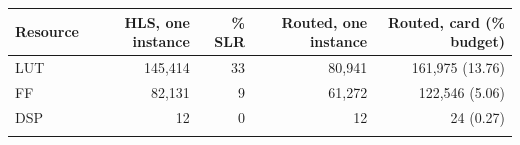 \begin{tabular}{@{}lrrrr@{}}
\toprule
Resource & HLS, one instance & \% SLR & Routed, one instance & Routed, card (\% budget) \\
\midrule
LUT & 145{,}414 & 33 & 80{,}941 & 161{,}975 (13.76) \\
FF & 82{,}131 & 9 & 61{,}272 & 122{,}546 (5.06) \\
DSP & 12 & 0 & 12 & 24 (0.27) \\
\botrule
\end{tabular}
